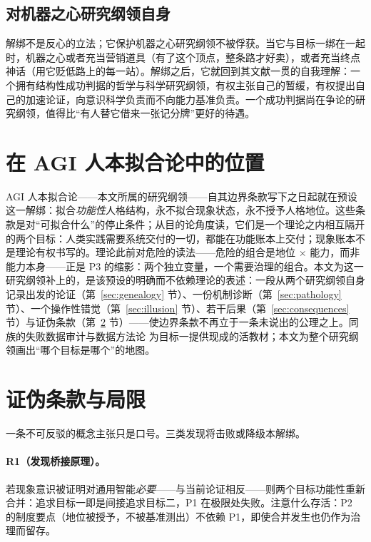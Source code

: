 \documentclass[10pt,fontset=fandol]{ctexart}
\begin{document}
\subsection{对机器之心研究纲领自身}\label{sec:mcheart}

解绑不是反心的立法；它保护机器之心研究纲领不被俘获。当它与目标一绑在一起时，机器之心或者充当营销道具（有了这个顶点，整条路才好卖），或者充当终点神话（用它贬低路上的每一站）。解绑之后，它就回到其文献一贯的自我理解：一个拥有结构性成功判据的哲学与科学研究纲领，有权主张自己的暂缓\cite{metzinger2021artificial}，有权提出自己的加速论证\cite{amcs2023letter}，向意识科学负责而不向能力基准负责。一个成功判据尚在争论的研究纲领，值得比“有人替它借来一张记分牌”更好的待遇。

\section{在 AGI 人本拟合论中的位置}\label{sec:family}

AGI 人本拟合论——本文所属的研究纲领——自其边界条款写下之日起就在预设这一解绑：拟合\emph{功能性}人格结构，永不拟合现象状态，永不授予人格地位\cite{yu2026fitting}。这些条款是对“可拟合什么”的停止条件；从目的论角度读，它们是一个理论之内相互隔开的两个目标：人类实践需要系统交付的一切，都能在功能账本上交付；现象账本不是理论有权书写的。理论此前对危险的读法——危险的组合是地位 $\times$ 能力，而非能力本身\cite{yu2026fitting}——正是 P3 的缩影：两个独立变量，一个需要治理的组合。本文为这一研究纲领补上的，是该预设的明确而不依赖理论的表述：一段从两个研究纲领自身记录出发的论证（第~\ref{sec:genealogy} 节）、一份机制诊断（第~\ref{sec:pathology} 节）、一个操作性错觉（第~\ref{sec:illusion} 节）、若干后果（第~\ref{sec:consequences} 节）与证伪条款（第~\ref{sec:falsification} 节）——使边界条款不再立于一条未说出的公理之上。同族的失败数据审计与数据方法论\cite{yu2026failureaudit,yu2026methodology} 为目标一提供现成的活教材；本文为整个研究纲领画出“哪个目标是哪个”的地图。

\section{证伪条款与局限}\label{sec:falsification}

一条不可反驳的概念主张只是口号。三类发现将击败或降级本解绑。

\paragraph{R1（发现桥接原理）。}若现象意识被证明对通用智能\emph{必要}——与当前论证相反\cite{pesonen2026notobstacles}——则两个目标功能性重新合并：追求目标一即是间接追求目标二，P1 在极限处失败。注意什么存活：P2 的制度要点（地位被授予，不被基准测出）不依赖 P1，即使合并发生也仍作为治理而留存。
\end{document}
